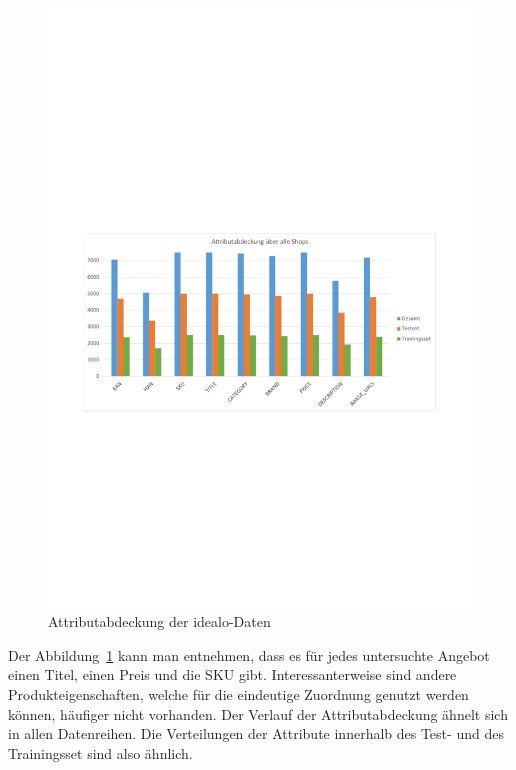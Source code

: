 \begin{figure}[H]
    \centering
    \includegraphics[width=\textwidth, trim=1.5cm 9.5cm 1.5cm 11cm, clip]{resources/Attributabdeckung-idealo-Daten.pdf}
    \caption{Attributabdeckung der idealo-Daten}
    \label{abb:testdaten}
\end{figure}

Der Abbildung~\ref{abb:testdaten} kann man entnehmen, dass es für jedes untersuchte Angebot einen Titel, einen Preis
und die SKU gibt.
Interessanterweise sind andere Produkteigenschaften, welche für die eindeutige Zuordnung genutzt werden können,
häufiger nicht vorhanden.
Der Verlauf der Attributabdeckung ähnelt sich in allen Datenreihen.
Die Verteilungen der Attribute innerhalb des Test- und des Trainingsset sind also ähnlich.